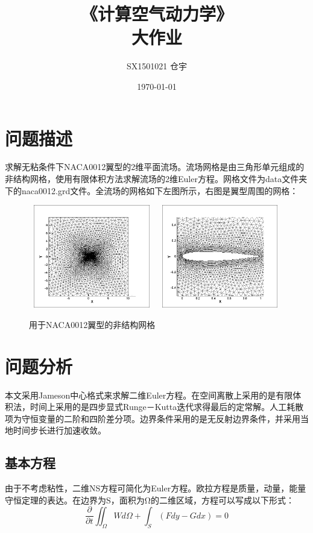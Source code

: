 \documentclass[UTF8]{ctexart}
\title{\heiti 《计算空气动力学》 \\ 大作业}
\author{SX1501021 仓宇}
\date{\today}
\begin{document}
\maketitle
\setcounter{page}{0}
\thispagestyle{empty}
\clearpage

\tableofcontents
\clearpage

\section{问题描述}
求解无粘条件下NACA0012翼型的2维平面流场。流场网格是由三角形单元组成的非结构网格，使用有限体积方法求解流场的2维Euler方程。网格文件为data文件夹下的naca0012.grd文件。全流场的网格如下左图所示，右图是翼型周围的网格：
\begin{figure}[htbp]
\centering\includegraphics[width=5.5cm,height=4.5cm]{../data/mesh_naca0012.png}
\centering\includegraphics[width=5.5cm,height=4.5cm]{../data/mesh_naca0012_local.png}
\caption{用于NACA0012翼型的非结构网格}
\end{figure}

\section{问题分析}
本文采用Jameson中心格式来求解二维Euler方程。在空间离散上采用的是有限体积法，时间上采用的是四步显式Runge－Kutta迭代求得最后的定常解。人工耗散项为守恒变量的二阶和四阶差分项。边界条件采用的是无反射边界条件，并采用当地时间步长进行加速收敛。

\subsection{基本方程}
由于不考虑粘性，二维NS方程可简化为Euler方程。欧拉方程是质量，动量，能量守恒定理的表达。在边界为S，面积为Ω的二维区域，方程可以写成以下形式：
\begin{equation}
\frac{\partial}{\partial t} \iint_{\Omega} W d\Omega + \int_{S} (Fdy-Gdx) = 0
\end{equation}
\end{document}
